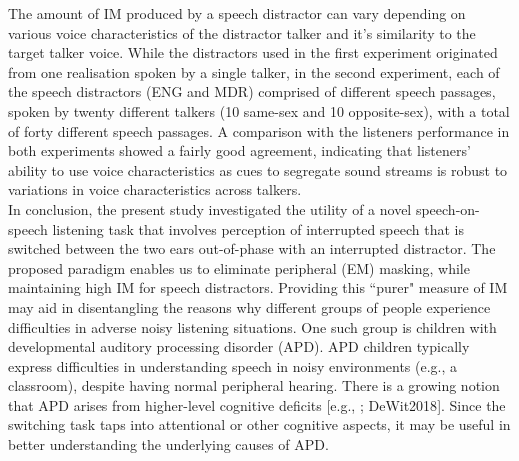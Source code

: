 \documentclass[a4paper, twoside]{templates/ociamthesis}
\begin{document}
The amount of IM produced by a speech distractor can vary depending on various voice characteristics of the distractor talker and it's similarity to the target talker voice. While the distractors used in the first experiment originated from one realisation spoken by a single talker, in the second experiment, each of the speech distractors (ENG and MDR) comprised of different speech passages, spoken by twenty different talkers (10 same-sex and 10 opposite-sex), with a total of forty different speech passages. A comparison with the listeners performance in both experiments showed a fairly good agreement, indicating that listeners' ability to use voice characteristics as cues to segregate sound streams is robust to variations in voice characteristics across talkers.\\

In conclusion, the present study investigated the utility of a novel speech-on-speech listening task that involves perception of interrupted speech that is switched between the two ears out-of-phase with an interrupted distractor. The proposed paradigm enables us to eliminate peripheral (EM) masking, while maintaining high IM for speech distractors. Providing this ``purer" measure of IM may aid in disentangling the reasons why different groups of people experience difficulties in adverse noisy listening situations. One such group is children with developmental auditory processing disorder (APD). APD children typically express difficulties in understanding speech in noisy environments (e.g., a classroom), despite having normal peripheral hearing. There is a growing notion that APD arises from higher-level cognitive deficits {[}e.g., \textcite{Moore2010}; DeWit2018{]}. Since the switching task taps into attentional or other cognitive aspects, it may be useful in better understanding the underlying causes of APD.\\
\end{document}
